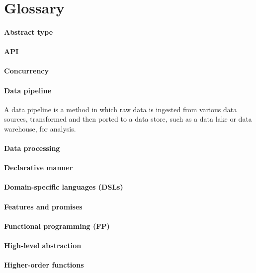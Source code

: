 \chapter*{Glossary}


\subsubsection{Abstract type}
\subsubsection{API}
\subsubsection{Concurrency}
\subsubsection{Data pipeline}

A data pipeline is a method in which raw data is ingested from various data sources, transformed and then ported to a data store, such as a data lake or data warehouse, for analysis.

\subsubsection{Data processing}
\subsubsection{Declarative manner}
\subsubsection{Domain-specific languages (DSLs)}
\subsubsection{Features and promises}
\subsubsection{Functional programming (FP)}
\subsubsection{High-level abstraction}
\subsubsection{Higher-order functions}
